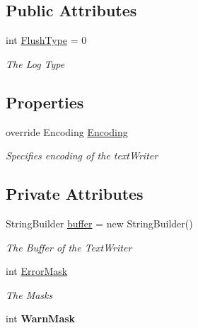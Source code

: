 \subsection*{Public Attributes}
\begin{DoxyCompactItemize}
\item 
int \mbox{\hyperlink{class_a_d_l_1_1_unity_1_1_unity_text_writer_a5d9cf1373da2cf300bf88f11f8ec078a}{Flush\+Type}} = 0
\begin{DoxyCompactList}\small\item\em The Log Type \end{DoxyCompactList}\end{DoxyCompactItemize}
\subsection*{Properties}
\begin{DoxyCompactItemize}
\item 
override Encoding \mbox{\hyperlink{class_a_d_l_1_1_unity_1_1_unity_text_writer_ae188dacb6a045f6f314480f0fbd18ccc}{Encoding}}
\begin{DoxyCompactList}\small\item\em Specifies encoding of the text\+Writer \end{DoxyCompactList}\end{DoxyCompactItemize}
\subsection*{Private Attributes}
\begin{DoxyCompactItemize}
\item 
String\+Builder \mbox{\hyperlink{class_a_d_l_1_1_unity_1_1_unity_text_writer_a82d384fccb5754b9151b8b71343df72c}{buffer}} = new String\+Builder()
\begin{DoxyCompactList}\small\item\em The Buffer of the Text\+Writer \end{DoxyCompactList}\item 
int \mbox{\hyperlink{class_a_d_l_1_1_unity_1_1_unity_text_writer_a150a993a52f0ede7a6f8ba04728b4bfe}{Error\+Mask}}
\begin{DoxyCompactList}\small\item\em The Masks \end{DoxyCompactList}\item 
\mbox{\label{class_a_d_l_1_1_unity_1_1_unity_text_writer_ae07fed312fdf4cc4e305d9f6ba9159a5}} 
int {\bfseries Warn\+Mask}
\end{DoxyCompactItemize}


